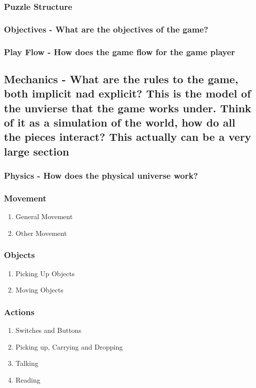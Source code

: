 \documentclass[article, 11pt]{article}
\begin{document}
\subsubsection{Puzzle Structure}
\label{sec:org8d815d2}
\subsubsection{Objectives - What are the objectives of the game?}
\label{sec:org7425bf5}
\subsubsection{Play Flow - How does the game flow for the game player}
\label{sec:orgbdeb225}
\subsection{Mechanics - What are the rules to the game, both implicit nad explicit? This is the model of the unvierse that the game works under. Think of it as a simulation of the world, how do all the pieces interact? This actually can be a very large section}
\label{sec:org7241c87}
\subsubsection{Physics - How does the physical universe work?}
\label{sec:orgee72f77}
\subsubsection{Movement}
\label{sec:org322f010}
\begin{enumerate}
\item General Movement
\label{sec:org55d12da}
\item Other Movement
\label{sec:org887facf}
\end{enumerate}
\subsubsection{Objects}
\label{sec:org6a487d3}
\begin{enumerate}
\item Picking Up Objects
\label{sec:orgd381bee}
\item Moving Objects
\label{sec:org730cd22}
\end{enumerate}
\subsubsection{Actions}
\label{sec:org8464467}
\begin{enumerate}
\item Switches and Buttons
\label{sec:org8f03a80}
\item Picking up, Carrying and Dropping
\label{sec:orgf217cd4}
\item Talking
\label{sec:orge7db481}
\item Reading
\label{sec:org5cebd86}
\end{enumerate}
\end{document}

